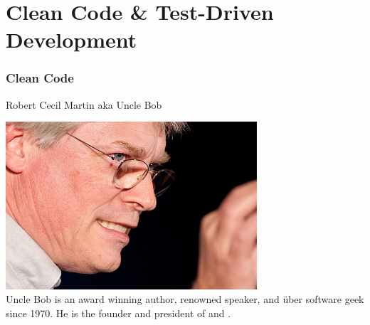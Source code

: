 \part[Clean Code \& TDD]{Clean Code \& Test-Driven Development}
\section{Clean Code}
\begin{frame}{Robert Cecil Martin aka Uncle Bob}
\begin{center}
\includegraphics[width=0.7\textwidth]{resources/BobAtRails.jpg}\\
Uncle Bob is an award winning author, renowned speaker, and \"uber software
geek since 1970. He is the founder and president of
 and .
\end{center}
\end{frame}


